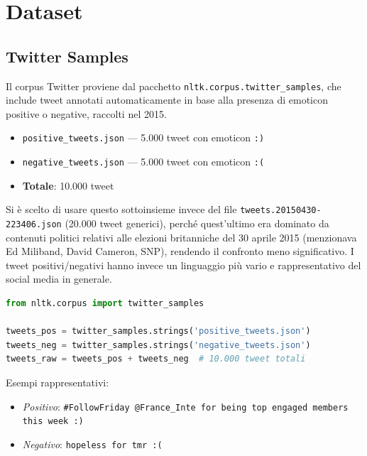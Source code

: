 \documentclass[12pt, a4paper]{article}
\begin{document}
\section{Dataset}

\subsection{Twitter Samples}

Il corpus Twitter proviene dal pacchetto \texttt{nltk.corpus.twitter\_samples},
che include tweet annotati automaticamente in base alla presenza di emoticon
positive o negative, raccolti nel 2015.

\begin{itemize}[leftmargin=1.5cm]
    \item \texttt{positive\_tweets.json} --- 5.000 tweet con emoticon \texttt{:)}
    \item \texttt{negative\_tweets.json} --- 5.000 tweet con emoticon \texttt{:(}
    \item \textbf{Totale}: 10.000 tweet
\end{itemize}

Si è scelto di usare questo sottoinsieme invece del file
\texttt{tweets.20150430-223406.json} (20.000 tweet generici),
perché quest'ultimo era dominato da contenuti politici relativi
alle elezioni britanniche del 30 aprile 2015 (menzionava Ed Miliband,
David Cameron, SNP), rendendo il confronto meno significativo.
I tweet positivi/negativi hanno invece un linguaggio più vario e
rappresentativo del social media in generale.

\begin{lstlisting}[language=Python, caption=Caricamento del corpus Twitter]
from nltk.corpus import twitter_samples

tweets_pos = twitter_samples.strings('positive_tweets.json')
tweets_neg = twitter_samples.strings('negative_tweets.json')
tweets_raw = tweets_pos + tweets_neg  # 10.000 tweet totali
\end{lstlisting}

Esempi rappresentativi:
\begin{itemize}[leftmargin=1.5cm]
    \item \textit{Positivo}: \texttt{\#FollowFriday @France\_Inte for being top engaged members this week :)}
    \item \textit{Negativo}: \texttt{hopeless for tmr :(}
\end{itemize}
\end{document}
